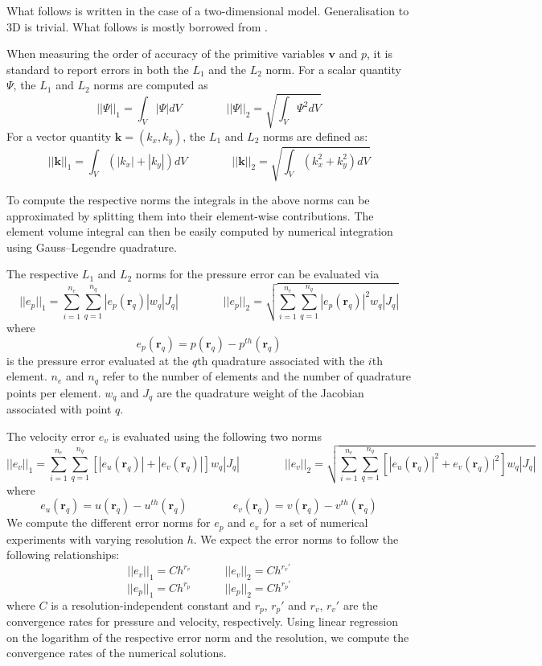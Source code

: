 What follows is written in the case of a two-dimensional model. Generalisation to
3D is trivial. What follows is mostly borrowed from \cite{thmk14}.

When measuring the order of accuracy of the primitive variables ${\bm v}$ and $p$,
it is standard to report errors in both the $L_1$ and the $L_2$ norm.
For a scalar quantity $\Psi$, the $L_1$ and $L_2$ norms are computed as
\[
||\Psi||_1 = \int_V |\Psi| dV
\quad\quad
\quad\quad
||\Psi||_2 = \sqrt{ \int_V \Psi^2 dV }
\]
For a vector quantity ${\bm k}=(k_x,k_y)$,
the $L_1$ and $L_2$ norms are defined as:
\[
||{\bm k}||_1 = \int_V (|k_x|+|k_y|) dV
\quad\quad
\quad\quad
||{\bm k}||_2 = \sqrt{ \int_V (k_x^2+k_y^2) dV }
\]

To compute the respective norms
the integrals in the above norms can be approximated by splitting them
into their element-wise contributions. The element volume integral can then
be easily computed by numerical integration using Gauss–Legendre quadrature.

The respective $L_1$ and $L_2$ norms for the pressure error can be evaluated via
\[
||e_p||_1 = \sum_{i=1}^{n_e} \sum_{q=1}^{n_q} |e_p({\bm r}_q)| w_q |J_q|
\quad\quad
\quad\quad
||e_p||_2=\sqrt{ \sum_{i=1}^{n_e} \sum_{q=1}^{n_q} |e_p({\bm r}_q)|^2 w_q |J_q| }
\]
where
\[
e_p({\bm r}_q)=p({\bm r}_q) - p^{th}({\bm r}_q)
\]
is the pressure error evaluated at the $q$th quadrature associated with
the $i$th element. $n_e$ and $n_q$ refer to the number of elements and
the number of quadrature points per element.
$w_q$ and $J_q$ are the quadrature weight of the Jacobian associated with
point $q$.

The velocity error $e_v$ is evaluated using the following two norms
\[
||e_v||_1 = \sum_{i=1}^{n_e} \sum_{q=1}^{n_q} [ |e_u({\bm r}_q)| + |e_v({\bm r}_q)| ]    w_q |J_q|
\quad\quad
\quad\quad
||e_v||_2=\sqrt{ \sum_{i=1}^{n_e} \sum_{q=1}^{n_q} \left[ |e_u({\bm r}_q)|^2 +  e_v({\bm r}_q)|^2 \right] w_q |J_q| }
\]
where
\[
e_u({\bm r}_q)=u({\bm r}_q) - u^{th}({\bm r}_q)
\quad\quad
\quad\quad
e_v({\bm r}_q)=v({\bm r}_q) - v^{th}({\bm r}_q)
\]
We compute the different error norms for $e_p$ and $e_v$ for a set of numerical experiments with
varying resolution $h$. We expect the error norms to follow the following relationships:
\[
||e_v||_1 = C h^{r_v} \quad\quad\quad ||e_v||_2 = C h^{r_v'}
\]
\[
||e_p||_1 = C h^{r_p} \quad\quad\quad ||e_p||_2 = C h^{r_p'}
\]
where $C$ is a resolution-independent constant
and $r_p$, $r_p'$ and $r_v$, $r_v'$ are the convergence rates for
pressure and velocity, respectively. Using linear regression
on the logarithm of the respective error norm and the resolution,
we compute the convergence rates of the numerical solutions.


